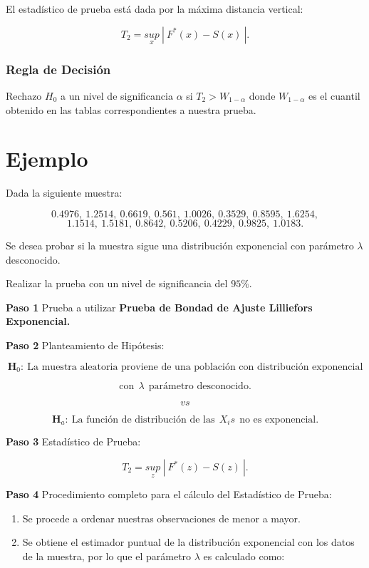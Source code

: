 \documentclass[
  a4paper,
  oneside,
  openany]{book}
\begin{document}
El estadístico de prueba está dada por la máxima distancia vertical:

\[T_{2}=\underset{x}{sup} \ | \ F^*(x)-S(x) \ |.\]

\hypertarget{regla-de-decisiuxf3n-31}{%
\subsubsection*{Regla de Decisión}\label{regla-de-decisiuxf3n-31}}


Rechazo \(H_0\) a un nivel de significancia \(\alpha\) si \(T_{2}> W_{1-\alpha}\) donde \(W_{1-\alpha}\) es el cuantil obtenido en las tablas correspondientes a nuestra prueba.

\hypertarget{ejemplo-15}{%
\section{Ejemplo}\label{ejemplo-15}}

Dada la siguiente muestra:

\[0.4976,\ 1.2514,\ 0.6619,\ 0.561,\ 1.0026,\ 0.3529,\ 0.8595,\ 1.6254,\]
\[1.1514,\ 1.5181,\ 0.8642,\ 0.5206,\ 0.4229,\ 0.9825,\ 1.0183.\]

Se desea probar si la muestra sigue una distribución exponencial con parámetro \(\lambda\) desconocido.

Realizar la prueba con un nivel de significancia del \(95\%\).

\textbf{Paso 1} Prueba a utilizar \textbf{Prueba de Bondad de Ajuste Lilliefors Exponencial.}

\textbf{Paso 2} Planteamiento de Hipótesis:

\[\textbf{H}_0: \ \mbox{La muestra aleatoria proviene de una población con distribución exponencial}\]

\[\mbox{con} \ \  \lambda \ \  \mbox{parámetro desconocido.}\]

\[vs\]

\[\textbf{H}_a: \ \mbox{La función de distribución de las} \ \  X_{i}s \ \  \mbox{no es exponencial.}\]

\textbf{Paso 3} Estadístico de Prueba:

\[T_{2}=\underset{z}{sup} \ | \ F^*(z)-S(z) \ |.\]

\textbf{Paso 4} Procedimiento completo para el cálculo del Estadístico de Prueba:

\begin{enumerate}
\def\labelenumi{\arabic{enumi})}
\item
  Se procede a ordenar nuestras observaciones de menor a mayor.
\item
  Se obtiene el estimador puntual de la distribución exponencial con los datos de la muestra, por lo que el parámetro \(\lambda\) es calculado como:
\end{enumerate}
\end{document}
